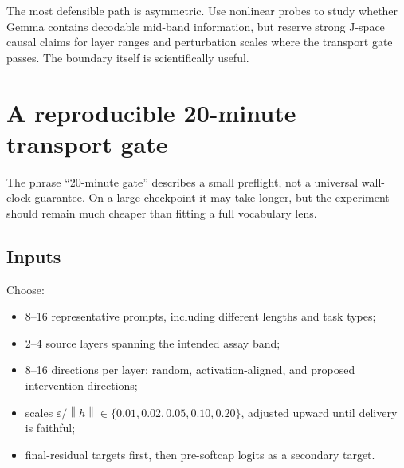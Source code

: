 \documentclass[11pt]{article}
\newcommand{\Norm}[1]{\left\lVert #1 \right\rVert}
\newcommand{\eps}{\varepsilon}
\theoremstyle{definition}
\theoremstyle{remark}
\begin{document}
\begin{resultbox}
The most defensible path is asymmetric. Use nonlinear probes to study whether Gemma contains decodable mid-band information, but reserve strong J-space causal claims for layer ranges and perturbation scales where the transport gate passes. The boundary itself is scientifically useful.
\end{resultbox}

\section{A reproducible 20-minute transport gate}

The phrase ``20-minute gate'' describes a small preflight, not a universal wall-clock guarantee. On a large checkpoint it may take longer, but the experiment should remain much cheaper than fitting a full vocabulary lens.

\subsection{Inputs}
Choose:
\begin{itemize}
  \item 8--16 representative prompts, including different lengths and task types;
  \item 2--4 source layers spanning the intended assay band;
  \item 8--16 directions per layer: random, activation-aligned, and proposed intervention directions;
  \item scales $\eps/\Norm{h}\in\{0.01,0.02,0.05,0.10,0.20\}$, adjusted upward until delivery is faithful;
  \item final-residual targets first, then pre-softcap logits as a secondary target.
\end{itemize}
\end{document}
